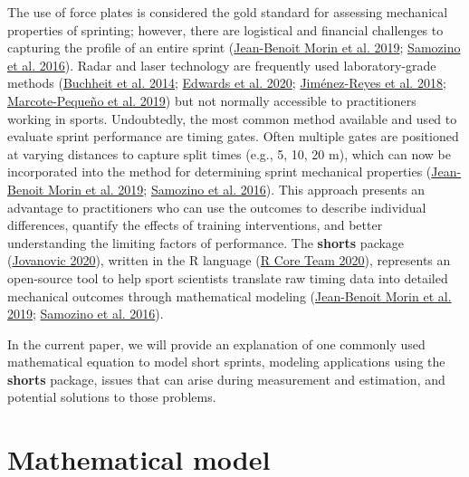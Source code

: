 \documentclass[fleqn,10pt,lineno]{wlpeerj} %
\begin{document}
The use of force plates is considered the gold standard for assessing mechanical properties of sprinting; however, there are logistical and financial challenges to capturing the profile of an entire sprint (\protect\hyperlink{ref-morinSimpleMethodComputing2019}{Jean-Benoit Morin et al. 2019}; \protect\hyperlink{ref-samozinoSimpleMethodMeasuring2016}{Samozino et al. 2016}). Radar and laser technology are frequently used laboratory-grade methods (\protect\hyperlink{ref-buchheitMechanicalDeterminantsAcceleration2014}{Buchheit et al. 2014}; \protect\hyperlink{ref-edwardsSprintAccelerationCharacteristics2020}{Edwards et al. 2020}; \protect\hyperlink{ref-jimenez-reyesRelationshipVerticalHorizontal2018}{Jiménez-Reyes et al. 2018}; \protect\hyperlink{ref-marcote-pequenoAssociationForceVelocity2019}{Marcote-Pequeño et al. 2019}) but not normally accessible to practitioners working in sports. Undoubtedly, the most common method available and used to evaluate sprint performance are timing gates. Often multiple gates are positioned at varying distances to capture split times (e.g., 5, 10, 20 m), which can now be incorporated into the method for determining sprint mechanical properties (\protect\hyperlink{ref-morinSimpleMethodComputing2019}{Jean-Benoit Morin et al. 2019}; \protect\hyperlink{ref-samozinoSimpleMethodMeasuring2016}{Samozino et al. 2016}). This approach presents an advantage to practitioners who can use the outcomes to describe individual differences, quantify the effects of training interventions, and better understanding the limiting factors of performance. The \textbf{shorts} package (\protect\hyperlink{ref-R-shorts}{Jovanovic 2020}), written in the R language (\protect\hyperlink{ref-R-base}{R Core Team 2020}), represents an open-source tool to help sport scientists translate raw timing data into detailed mechanical outcomes through mathematical modeling (\protect\hyperlink{ref-morinSimpleMethodComputing2019}{Jean-Benoit Morin et al. 2019}; \protect\hyperlink{ref-samozinoSimpleMethodMeasuring2016}{Samozino et al. 2016}).

In the current paper, we will provide an explanation of one commonly used mathematical equation to model short sprints, modeling applications using the \textbf{shorts} package, issues that can arise during measurement and estimation, and potential solutions to those problems.

\hypertarget{mathematical-model}{%
\section{Mathematical model}\label{mathematical-model}}
\end{document}
